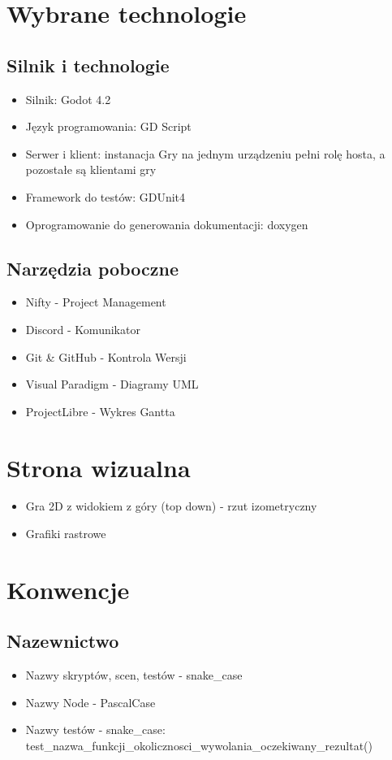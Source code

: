\documentclass[]{report}
\begin{document}
\section{Wybrane technologie}
\subsection{Silnik i technologie}
	\begin{itemize}
		\item Silnik: Godot 4.2
		\item Język programowania: GD Script
		\item Serwer i klient: instanacja Gry na jednym urządzeniu pełni rolę hosta, a pozostałe są klientami gry
		\item Framework do testów: GDUnit4
		\item Oprogramowanie do generowania dokumentacji: doxygen
	\end{itemize}
\subsection{Narzędzia poboczne}
\begin{itemize}
	\item Nifty - Project Management
	\item Discord - Komunikator
	\item Git \& GitHub - Kontrola Wersji
	\item Visual Paradigm - Diagramy UML
	\item ProjectLibre - Wykres Gantta
\end{itemize}

\section{Strona wizualna}
\begin{itemize}
	\item Gra 2D z widokiem z góry (top down) - rzut izometryczny
	\item Grafiki rastrowe
\end{itemize}

\section{Konwencje}
\subsection{Nazewnictwo}
	\begin{itemize}
		\item Nazwy skryptów, scen, testów - snake\_case
		\item Nazwy Node - PascalCase
		\item Nazwy testów - snake\_case: \newline test\_nazwa\_funkcji\_okolicznosci\_wywolania\_oczekiwany\_rezultat()
	
	\end{itemize}
\end{document}
